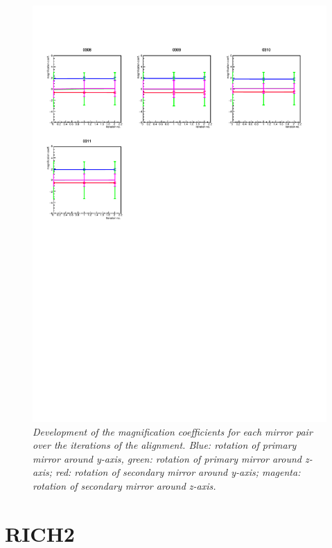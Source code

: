 \begin{figure}[!ht]
	\vspace*{-0.cm}
	\begin{center}
		\includegraphics[width=1.\textwidth]{rich1_mag2_2.pdf}
		\vspace*{-1.5cm}
	\end{center}
	\caption{\textit{Development of the magnification coefficients for each mirror pair over the iterations of the alignment. Blue: rotation of primary mirror around y-axis, green: rotation of primary mirror around z-axis; red: rotation of secondary mirror around y-axis; magenta: rotation of secondary mirror around z-axis.}}
	\label{fig:rich1mag2_2}
\end{figure}
\clearpage


\section{RICH2}
